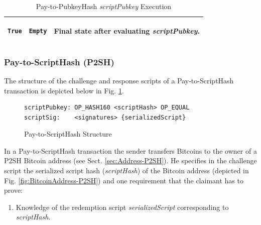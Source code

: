 \begin{table}[!ht]
\begin{minipage}{\textwidth}
\begin{tabular}{| m{95pt} | m{145pt} | m{100pt} |}
\vspace{8pt}
\begin{BVerbatim}[fontsize==\relsize{-4}]
True
\end{BVerbatim}
\vspace{4pt}
&
\vspace{8pt}
\begin{BVerbatim}[fontsize==\relsize{-4}]
Empty
\end{BVerbatim} 
\vspace{4pt}
&
Final state after evaluating \textit{scriptPubkey}.\\ \hline

\end{tabular}
\vspace{5pt}
\caption{Pay-to-PubkeyHash \textit{scriptPubkey} Execution}
\label{tab:P2PubHash2}

\end{minipage}
\end{table}

\clearpage
\subsubsection{Pay-to-ScriptHash (P2SH)} \label{sec:P2SH}
The structure of the challenge and response scripts of a Pay-to-ScriptHash transaction is depicted below in Fig. \ref{fig:P2ScriptHashStructure}.

\vspace{-10pt}
\begin{figure}[htbp]

\begin{Verbatim}[fontsize==\relsize{-4}, frame=single]  
scriptPubkey: OP_HASH160 <scriptHash> OP_EQUAL
scriptSig:    <signatures> {serializedScript}
\end{Verbatim}

\vspace{-15pt}
\caption{Pay-to-ScriptHash Structure}
\label{fig:P2ScriptHashStructure}
\end{figure}
\vspace{-10pt}

\noindent
In a Pay-to-ScriptHash transaction the sender transfers Bitcoins to the owner of a P2SH Bitcoin address (see Sect. \ref{sec:Address-P2SH}). He specifies in the challenge script the serialized script hash (\textit{scriptHash}) of the Bitcoin address (depicted in Fig. \ref{fig:BitcoinAddress-P2SH}) and one requirement that the claimant has to prove:

\begin{enumerate}[label=\arabic*), leftmargin=1cm]
\item Knowledge of the redemption script \textit{serializedScript} corresponding to\\ \textit{scriptHash}.
\end{enumerate}

